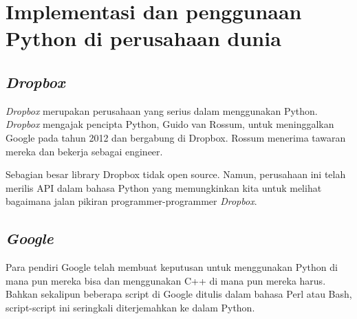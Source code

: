 \chapter*{Implementasi dan penggunaan Python di perusahaan dunia}
\section*{\textit{Dropbox}}
\par
{\textit{Dropbox}} merupakan perusahaan yang serius dalam menggunakan Python. {\textit{Dropbox}} mengajak pencipta Python, Guido van Rossum, untuk meninggalkan Google pada tahun 2012 dan bergabung di Dropbox. Rossum menerima tawaran mereka dan bekerja sebagai engineer.

Sebagian besar library Dropbox tidak open source. Namun, perusahaan ini telah merilis API dalam bahasa Python yang memungkinkan kita untuk melihat bagaimana jalan pikiran programmer-programmer {\textit{Dropbox}}.

\section*{\textit{Google}}
\par
Para pendiri Google telah membuat keputusan untuk menggunakan Python di mana pun mereka bisa dan menggunakan C++ di mana pun mereka harus. Bahkan sekalipun beberapa script di Google ditulis dalam bahasa Perl atau Bash, script-script ini seringkali diterjemahkan ke dalam Python.